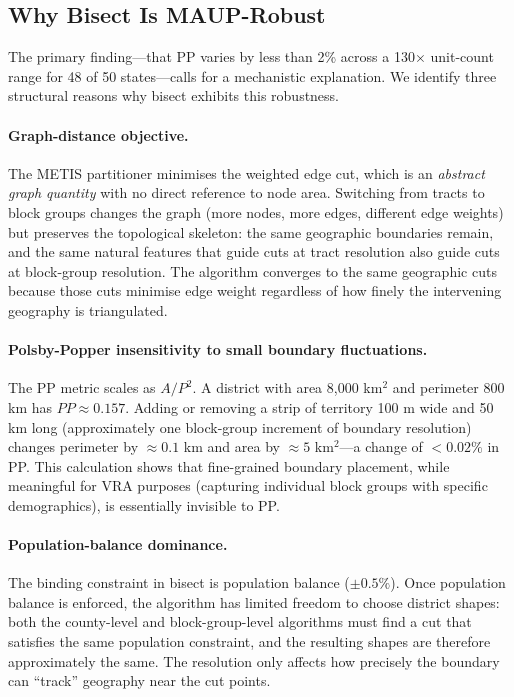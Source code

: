 \subsection{Why Bisect Is MAUP-Robust}

The primary finding---that PP varies by less than 2\% across a 130$\times$
unit-count range for 48 of 50 states---calls for a mechanistic explanation.
We identify three structural reasons why bisect exhibits this robustness.

\paragraph{Graph-distance objective.}
The METIS partitioner minimises the weighted edge cut, which is an
\emph{abstract graph quantity} with no direct reference to node area.
Switching from tracts to block groups changes the graph (more nodes, more
edges, different edge weights) but preserves the topological skeleton: the
same geographic boundaries remain, and the same natural features that guide
cuts at tract resolution also guide cuts at block-group resolution.  The
algorithm converges to the same geographic cuts because those cuts minimise
edge weight regardless of how finely the intervening geography is
triangulated.

\paragraph{Polsby-Popper insensitivity to small boundary fluctuations.}
The PP metric scales as $A / P^2$.  A district with area 8{,}000 km$^2$
and perimeter 800 km has $PP \approx 0.157$.  Adding or removing a strip of
territory 100 m wide and 50 km long (approximately one block-group increment
of boundary resolution) changes perimeter by $\approx 0.1$ km and area by
$\approx 5$ km$^2$---a change of $<0.02\%$ in PP.  This calculation shows
that fine-grained boundary placement, while meaningful for VRA purposes
(capturing individual block groups with specific demographics), is essentially
invisible to PP.

\paragraph{Population-balance dominance.}
The binding constraint in bisect is population balance ($\pm 0.5\%$).  Once
population balance is enforced, the algorithm has limited freedom to choose
district shapes: both the county-level and block-group-level algorithms
must find a cut that satisfies the same population constraint, and the
resulting shapes are therefore approximately the same.  The resolution only
affects how precisely the boundary can ``track'' geography near the cut
points.

